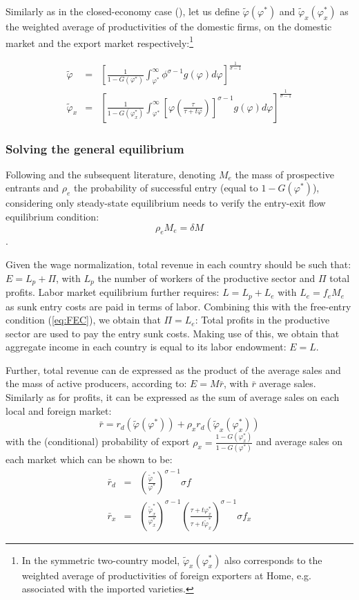 \documentclass[a4paper,11pt]{article}
\begin{document}
Similarly as in the closed-economy case (\cite{melitz}), let us define $\widetilde{\varphi}(\varphi^\ast)$ and $\widetilde{\varphi}_x(\varphi_x^\ast)$ as the weighted average of productivities of the domestic firms, on the domestic market and the export market respectively:\footnote{In the symmetric two-country model, $\widetilde{\varphi}_x(\varphi_x^\ast)$ also corresponds to the weighted average of productivities of foreign exporters at Home, e.g. associated with the imported varieties.}

\begin{eqnarray}
\widetilde{\varphi} &=& \left[\frac{1}{1-G(\varphi^\ast)}\int_{\varphi^\ast}^\infty \phi^{\sigma-1}g(\varphi)d\varphi   \right]^{\frac{1}{\sigma-1}} \label{eq:def_phitilde}\\
\widetilde{\varphi}_x &=& \left[\frac{1}{1-G(\varphi_x^\ast)}\int_{\varphi^\ast}^\infty \left[\varphi\left(\frac{\tau}{\tau+t \varphi}  \right) \right]^{\sigma-1}g(\varphi)d\varphi   \right]^{\frac{1}{\sigma-1}} \label{eq:def_phitildex}
\end{eqnarray}

\subsubsection{Solving the general equilibrium}

Following \cite{melitz} and the subsequent literature, denoting $M_e$ the mass of prospective entrants and $\rho_e$ the probability of successful entry (equal to $1-G(\varphi^\ast)$), considering only steady-state equilibrium needs to verify the entry-exit flow equilibrium condition:
$$\rho_e M_e = \delta M$$.

Given the wage normalization, total revenue in each country should be such that: $E = L_p+\Pi$, with $L_p$ the number of workers of the productive sector and $\Pi$ total profits. Labor market equilibrium further requires: $L = L_p+ L_e$ with $L_e = f_eM_e$ as sunk entry costs are paid in terms of labor. Combining this with the free-entry condition (\ref{eq:FEC}), we obtain that $\Pi = L_e$: Total profits in the productive sector are used to pay the entry sunk costs. Making use of this, we obtain that aggregate income in each country is equal to its labor endowment: $E =L$.

Further, total revenue can de expressed as the product of the average sales and the mass of active producers, according to: $E = M\bar{r}$, with $\bar{r}$ average sales. Similarly as for profits, it can be expressed as the sum of average sales on each local and foreign market:
$$\bar{r} = r_d(\widetilde{\varphi}(\varphi^\ast))+ \rho_x r_d(\widetilde{\varphi}_x(\varphi_x^\ast))$$
\noindent with the (conditional) probability of export $\rho_x = \frac{1-G(\varphi^\ast_x)}{1-G(\varphi^\ast)}$ and average sales on each market which can be shown to be:
\begin{eqnarray*}
\bar{r}_d &=& \left(\frac{\widetilde{\varphi}^\ast}{\varphi^\ast}\right)^{\sigma-1} \sigma f \\
\bar{r}_x &=& \left(\frac{\widetilde{\varphi}_x^\ast}{\varphi_x^\ast}\right)^{\sigma-1}\left(\frac{\tau+ t \varphi^\ast_x}{\tau+ t \widetilde{\varphi}^\ast_x}\right)^{\sigma-1} \sigma f_x
\end{eqnarray*}
\end{document}
